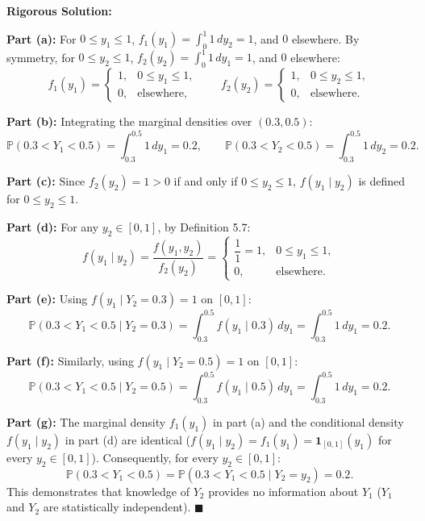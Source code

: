 \documentclass[11pt, letterpaper]{article}
\theoremstyle{definition}
\theoremstyle{remark}
\newcommand{\Prob}{\mathbb{P}}
\begin{document}
\textbf{Rigorous Solution:}

\textbf{Part (a):} For $0 \le y_1 \le 1$, $f_1(y_1) = \int_0^1 1 \, dy_2 = 1$, and $0$ elsewhere. By symmetry, for $0 \le y_2 \le 1$, $f_2(y_2) = \int_0^1 1 \, dy_1 = 1$, and $0$ elsewhere:
\[ f_1(y_1) = \begin{cases} 1, & 0 \le y_1 \le 1, \\ 0, & \text{elsewhere,} \end{cases} \qquad f_2(y_2) = \begin{cases} 1, & 0 \le y_2 \le 1, \\ 0, & \text{elsewhere.} \end{cases} \]

\textbf{Part (b):} Integrating the marginal densities over $(0.3, 0.5)$:
\[ \Prob(0.3 < Y_1 < 0.5) = \int_{0.3}^{0.5} 1 \, dy_1 = 0.2, \qquad \Prob(0.3 < Y_2 < 0.5) = \int_{0.3}^{0.5} 1 \, dy_2 = 0.2. \]

\textbf{Part (c):} Since $f_2(y_2) = 1 > 0$ if and only if $0 \le y_2 \le 1$, $f(y_1 \mid y_2)$ is defined for $0 \le y_2 \le 1$.

\textbf{Part (d):} For any $y_2 \in [0, 1]$, by Definition 5.7:
\[ f(y_1 \mid y_2) = \frac{f(y_1, y_2)}{f_2(y_2)} = \begin{cases} \dfrac{1}{1} = 1, & 0 \le y_1 \le 1, \\ 0, & \text{elsewhere.} \end{cases} \]

\textbf{Part (e):} Using $f(y_1 \mid Y_2 = 0.3) = 1$ on $[0, 1]$:
\[ \Prob(0.3 < Y_1 < 0.5 \mid Y_2 = 0.3) = \int_{0.3}^{0.5} f(y_1 \mid 0.3) \, dy_1 = \int_{0.3}^{0.5} 1 \, dy_1 = 0.2. \]

\textbf{Part (f):} Similarly, using $f(y_1 \mid Y_2 = 0.5) = 1$ on $[0, 1]$:
\[ \Prob(0.3 < Y_1 < 0.5 \mid Y_2 = 0.5) = \int_{0.3}^{0.5} f(y_1 \mid 0.5) \, dy_1 = \int_{0.3}^{0.5} 1 \, dy_1 = 0.2. \]

\textbf{Part (g):} The marginal density $f_1(y_1)$ in part (a) and the conditional density $f(y_1 \mid y_2)$ in part (d) are identical ($f(y_1 \mid y_2) = f_1(y_1) = \mathbf{1}_{[0,1]}(y_1)$ for every $y_2 \in [0, 1]$). Consequently, for every $y_2 \in [0, 1]$:
\[ \Prob(0.3 < Y_1 < 0.5) = \Prob(0.3 < Y_1 < 0.5 \mid Y_2 = y_2) = 0.2. \]
This demonstrates that knowledge of $Y_2$ provides no information about $Y_1$ ($Y_1$ and $Y_2$ are statistically independent). $\blacksquare$

\end{document}
